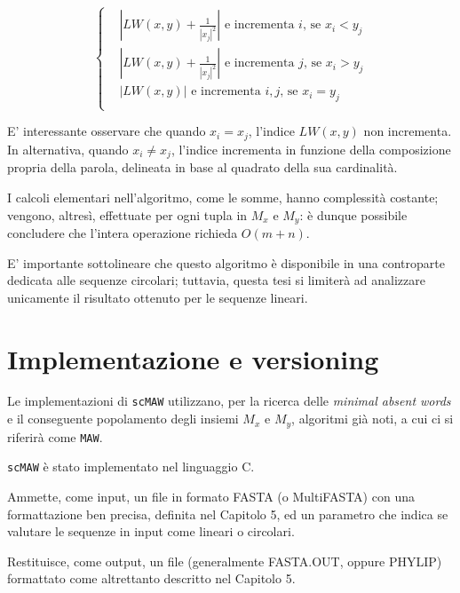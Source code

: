 \begin{equation*}
  \left\{
    \begin{aligned}
      & {\left|
        LW(x,y) + \frac{1}{|x_j |^2}
      \right|} \text{ e incrementa } i\text{, se } x_i < y_j \\
      & {\left|
        LW(x,y) + \frac{1}{|x_j |^2}
      \right|} \text{ e incrementa } j\text{, se } x_i > y_j \\
      & {\left|
        LW(x,y)
      \right|} \text{ e incrementa } i,j\text{, se } x_i = y_j \\
    \end{aligned}
  \right.
\end{equation*}

E' interessante osservare che quando $x_i = x_j$, l'indice $LW(x,y)$ non incrementa. In alternativa, quando $x_i\not= x_j$, l'indice incrementa in funzione della composizione propria della parola, delineata in base al quadrato della sua cardinalità.

\vspace{3mm}

I calcoli elementari nell'algoritmo, come le somme, hanno complessità costante; vengono, altresì, effettuate per ogni tupla in $M_x$ e $M_y$: è dunque possibile concludere che l'intera operazione richieda $O(m+n)$.

\vspace{3mm}

E' importante sottolineare che questo algoritmo è disponibile in una controparte dedicata alle sequenze circolari; tuttavia, questa tesi si limiterà ad analizzare unicamente il risultato ottenuto per le sequenze lineari.

\section{Implementazione e versioning}

Le implementazioni di \verb|scMAW| utilizzano, per la ricerca delle \textit{minimal absent words} e il conseguente popolamento degli insiemi $M_x$ e $M_y$, algoritmi già noti, a cui ci si riferirà come \verb|MAW|. 

\verb|scMAW| è stato implementato nel linguaggio C. 

Ammette, come input, un file in formato FASTA (o MultiFASTA) con una formattazione ben precisa, definita nel Capitolo 5, ed un parametro che indica se valutare le sequenze in input come lineari o circolari. 

Restituisce, come output, un file (generalmente FASTA.OUT, oppure PHYLIP) formattato come altrettanto descritto nel Capitolo 5. 

